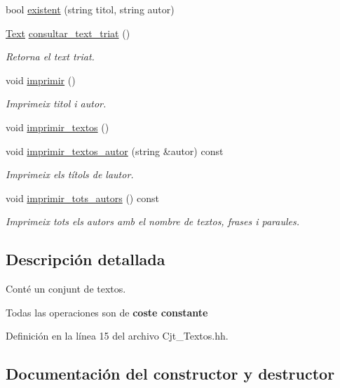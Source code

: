 \begin{DoxyCompactItemize}
bool \hyperlink{class_cjt___textos_a04f209abc7bbeb2d55715a32f950a8df}{existent} (string titol, string autor)
\item 
\hyperlink{class_text}{Text} \hyperlink{class_cjt___textos_ab9be9e85d5d74013e4596c8bc612adae}{consultar\+\_\+text\+\_\+triat} ()
\begin{DoxyCompactList}\small\item\em Retorna el text triat. \end{DoxyCompactList}\item 
void \hyperlink{class_cjt___textos_a06713274106c1639f99102cb4977e0aa}{imprimir} ()
\begin{DoxyCompactList}\small\item\em Imprimeix titol i autor. \end{DoxyCompactList}\item 
void \hyperlink{class_cjt___textos_acea595bafcaf74bb82b4eb8bb3164314}{imprimir\+\_\+textos} ()
\item 
void \hyperlink{class_cjt___textos_a73d74ade60f967c56fd463b4a78c9886}{imprimir\+\_\+textos\+\_\+autor} (string \&autor) const 
\begin{DoxyCompactList}\small\item\em Imprimeix els títols de l\textquotesingle{}autor. \end{DoxyCompactList}\item 
void \hyperlink{class_cjt___textos_abfab611c433280199a2b1a035fdab840}{imprimir\+\_\+tots\+\_\+autors} () const 
\begin{DoxyCompactList}\small\item\em Imprimeix tots els autors amb el nombre de textos, frases i paraules. \end{DoxyCompactList}\end{DoxyCompactItemize}


\subsection{Descripción detallada}
Conté un conjunt de textos. 

Todas las operaciones son de {\bfseries coste constante} 

Definición en la línea 15 del archivo Cjt\+\_\+\+Textos.\+hh.



\subsection{Documentación del constructor y destructor}
